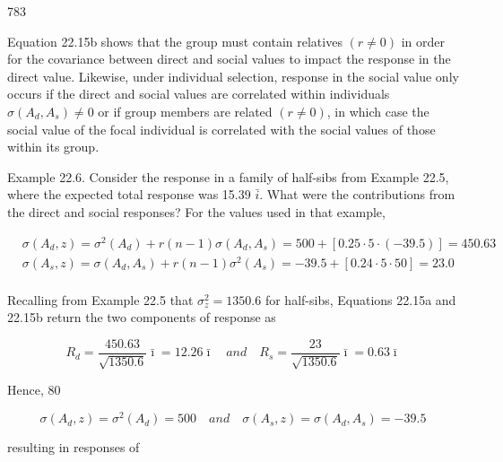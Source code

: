 \documentclass{article}
\begin{document}
783

Equation 22.15b shows that the group must contain relatives  $ (r \neq 0) $ in order for the covariance between direct and social values to impact the response in the direct value. Likewise, under individual selection, response in the social value only occurs if the direct and social values are correlated within individuals  $ \sigma(A_d, A_s) \neq 0 $ or if group members are related  $ (r \neq 0) $, in which case the social value of the focal individual is correlated with the social values of those within its group.

Example 22.6. Consider the response in a family of half-sibs from Example 22.5, where the expected total response was 15.39 $ \bar{i} $. What were the contributions from the direct and social responses? For the values used in that example,

\begin{equation}
\begin{aligned}&\sigma(A_{d},z)=\sigma^{2}(A_{d})+r(n-1)\sigma(A_{d},A_{s})=500+[0.25\cdot5\cdot(-39.5)]=450.63\\ &\sigma(A_{s},z)=\sigma(A_{d},A_{s})+r(n-1)\sigma^{2}(A_{s})=-39.5+[0.24\cdot5\cdot50]=23.0\\ \end{aligned}
\end{equation}

Recalling from Example 22.5 that  $ \sigma_z^2 = 1350.6 $ for half-sibs, Equations 22.15a and 22.15b return the two components of response as

\begin{equation}
R_{d}=\frac{450.63}{\sqrt{1350.6}}\bar{\imath}=12.26\bar{\imath}\quad and\quad R_{s}=\frac{23}{\sqrt{1350.6}}\bar{\imath}=0.63\bar{\imath}
\end{equation}

Hence, 80%

\begin{equation}
\sigma(A_{d},z)=\sigma^{2}(A_{d})=500\quad and\quad\sigma(A_{s},z)=\sigma(A_{d},A_{s})=-39.5
\end{equation}

resulting in responses of
\end{document}

